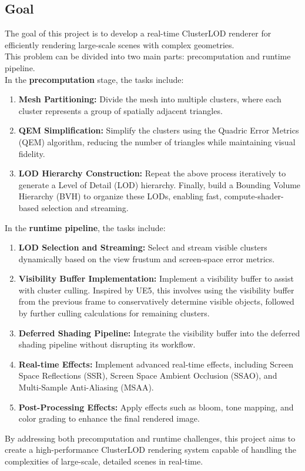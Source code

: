 \documentclass[12pt]{extarticle}
\newcommand{\customnewline}{\\[1.5em]}
\begin{document}
\subsection{Goal}
The goal of this project is to develop a real-time ClusterLOD renderer for efficiently rendering large-scale scenes with complex geometries.
\customnewline
This problem can be divided into two main parts: precomputation and runtime pipeline. 
\customnewline
In the \textbf{precomputation} stage, the tasks include:
\begin{enumerate}
    \item \textbf{Mesh Partitioning:} Divide the mesh into multiple clusters, where each cluster represents a group of spatially adjacent triangles.
    \item \textbf{QEM Simplification:} Simplify the clusters using the Quadric Error Metrics (QEM) algorithm, reducing the number of 
    triangles while maintaining visual fidelity.
    \item \textbf{LOD Hierarchy Construction:} Repeat the above process iteratively to generate a Level of Detail (LOD) hierarchy. Finally, 
    build a Bounding Volume Hierarchy (BVH) to organize these LODs, enabling fast, compute-shader-based selection and streaming.
\end{enumerate}
In the \textbf{runtime pipeline}, the tasks include:
\begin{enumerate}
    \item \textbf{LOD Selection and Streaming:} Select and stream visible clusters dynamically based on the view frustum and screen-space 
    error metrics.
    \item \textbf{Visibility Buffer Implementation:} Implement a visibility buffer to assist with cluster culling. Inspired by UE5, this 
    involves using the visibility buffer from the previous frame to conservatively determine visible objects, followed by further culling 
    calculations for remaining clusters.
    \item \textbf{Deferred Shading Pipeline:} Integrate the visibility buffer into the deferred shading pipeline without disrupting its workflow.
    \item \textbf{Real-time Effects:} Implement advanced real-time effects, including Screen Space Reflections (SSR), Screen Space Ambient 
    Occlusion (SSAO), and Multi-Sample Anti-Aliasing (MSAA).
    \item \textbf{Post-Processing Effects:} Apply effects such as bloom, tone mapping, and color grading to enhance the final rendered image.
\end{enumerate}
By addressing both precomputation and runtime challenges, this project aims to create a high-performance ClusterLOD rendering system capable 
of handling the complexities of large-scale, detailed scenes in real-time.
\end{document}
